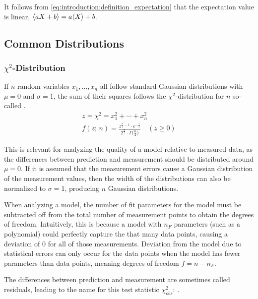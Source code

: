 It follows from \autoref{eq:introduction:definition_expectation} that the expectation value is linear, \( \langle aX + b\rangle = a \langle X\rangle + b \).




\subsection{Common Distributions}

\subsubsection{\( \chi^2 \)-Distribution}

If \( n \) random variables \( x_1, \dotsc, x_n \) all follow standard Gaussian distributions with \( \mu = 0 \) and \( \sigma = 1 \), the sum of their squares follows the \( \chi^2 \)-distribution for \( n \) so-called .
\begin{gather}
    z = \chi^2 = x_1^2 + \dotsb + x_n^2 \\
    f(z; \, n) = \frac{z^{\frac{n}{2} - 1} \cdot e^{-\frac{z}{2}}}{2^{\frac{n}{2}} \cdot \Gamma{\big( \frac{n}{2} \big)}} \quad (z ≥ 0)
    \label{eq:introduction:chi_square_distribution}
\end{gather}

This is relevant for analyzing the quality of a model relative to measured data, as the differences between prediction and measurement should be distributed around \( \mu = 0 \). If it is assumed that the measurement errors cause a Gaussian distribution of the measurement values, then the width of the distributions can also be normalized to \( \sigma = 1 \), producing \( n \) Gaussian distributions.

When analyzing a model, the number of fit parameters for the model must be subtracted off from the total number of measurement points to obtain the degrees of freedom. Intuitively, this is because a model with \( n_F \) parameters (such as a polynomial) could perfectly capture the that many data points, causing a deviation of \( 0 \) for all of those measurements. Deviation from the model due to statistical errors can only occur for the  data points when the model has fewer parameters than data points, meaning degrees of freedom \( f = n - n_F \).

The differences between prediction and measurement are sometimes called residuals, leading to the name for this test statistic \( \chi^2_{obs} \): .

